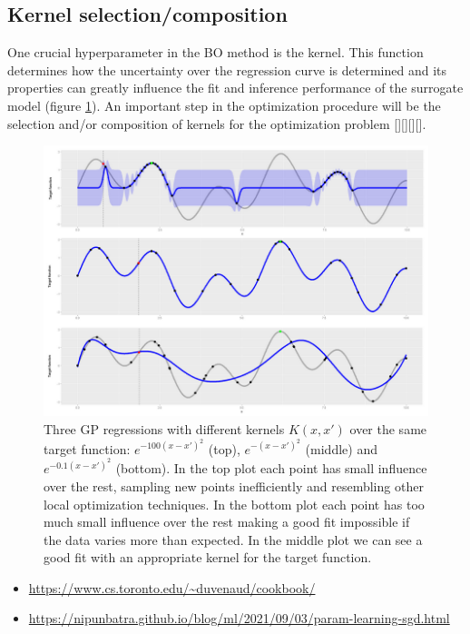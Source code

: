 \subsection{Kernel selection/composition}
One crucial hyperparameter in the BO method is the kernel. This function determines how the uncertainty over the regression curve is determined and its properties can greatly influence the fit and inference performance of the surrogate model (figure \ref{fig:bo_gp_kernel}). An important step in the optimization procedure will be the selection and/or composition of kernels for the optimization problem [\cite{repicky_automated_nodate}][\cite{duvenaud_automatic_nodate}][\cite{duvenaud_additive_2011}][\cite{duvenaud_structure_2013}].

\begin{figure}[h]
	\centering
	\includegraphics[width=\textwidth]{figures/bo_gp_kernel}
	\decoRule
	\caption[GP kernels]{Three GP regressions with different kernels $K(x,x')$ over the same target function: $e^{-100(x-x')^2}$ (top), $e^{-(x-x')^2}$ (middle) and $e^{-0.1(x-x')^2}$ (bottom). In the top plot each point has small influence over the rest, sampling new points inefficiently and resembling other local optimization techniques. In the bottom plot each point has too much small influence over the rest making a good fit impossible if the data varies more than expected. In the middle plot we can see a good fit with an appropriate kernel for the target function.}
	\label{fig:bo_gp_kernel}
\end{figure}

\begin{itemize}
\item \url{https://www.cs.toronto.edu/~duvenaud/cookbook/}
\item \url{https://nipunbatra.github.io/blog/ml/2021/09/03/param-learning-sgd.html}
\end{itemize}

